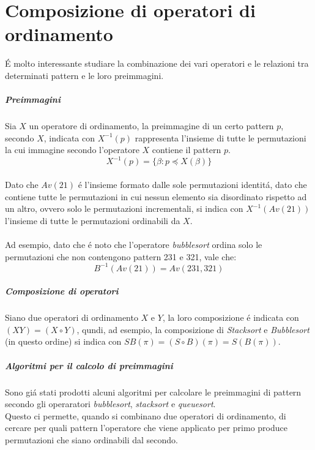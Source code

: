 \chapter{Composizione di operatori di ordinamento}
\'E molto interessante studiare la combinazione dei vari operatori e le relazioni tra determinati pattern e le loro preimmagini.\\
\paragraph*{Preimmagini} Sia $X$ un operatore di ordinamento, la preimmagine di un certo pattern $p$, secondo $X$, indicata con $X^{-1}(p)$ rappresenta l'insieme di tutte le permutazioni la cui immagine secondo l'operatore $X$ contiene il pattern $p$.$$X^{-1}(p) = \{\beta : p\preceq X(\beta)\}$$\\
Dato che $Av(21)$ \'e l'insieme formato dalle sole permutazioni identit\'a, dato che contiene tutte le permutazioni in cui nessun elemento sia disordinato rispetto ad un altro, ovvero solo le permutazioni incrementali, si indica con $X^{-1}(Av(21))$ l'insieme di tutte le permutazioni ordinabili da $X$.\\\\
Ad esempio, dato che \'e noto che l'operatore \textit{bubblesort} ordina solo le permutazioni che non contengono pattern 231 e 321, vale che:$$B^{-1}(Av(21)) = Av(231,321)$$
\paragraph*{Composizione di operatori} Siano due operatori di ordinamento $X$ e $Y$, la loro composizione \'e indicata con $( XY ) = ( X \circ Y )$, qundi, ad esempio, la composizione di \textit{Stacksort} e \textit{Bubblesort} (in questo ordine) si indica con $SB(\pi) = (S \circ B)(\pi) = S(B(\pi))$.
\paragraph*{Algoritmi per il calcolo di preimmagini} Sono gi\'a stati prodotti alcuni algoritmi per calcolare le preimmagini di pattern secondo gli operaratori \textit{bubblesort}\cite{albert2010inverse}, \textit{stacksort}\cite{claesson2012sorting} e \textit{queuesort}\cite{magnusson2013sorting}\cite{cioni2021characterization}.\\
Questo ci permette, quando si combinano due operatori di ordinamento, di cercare per quali pattern l'operatore che viene applicato per primo produce permutazioni che siano ordinabili dal secondo.
